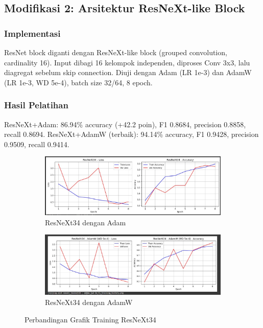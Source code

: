 \documentclass[11pt,a4paper]{article}
\begin{document}
\subsection{Modifikasi 2: Arsitektur ResNeXt-like Block}
\subsubsection{Implementasi}
ResNet block diganti dengan ResNeXt-like block (grouped convolution, cardinality 16). Input dibagi 16 kelompok independen, diproses Conv 3x3, lalu diagregat sebelum skip connection. Diuji dengan Adam (LR 1e-3) dan AdamW (LR 1e-3, WD 5e-4), batch size 32/64, 8 epoch.

\subsubsection{Hasil Pelatihan}
ResNeXt+Adam: 86.94\% accuracy (+42.2 poin), F1 0.8684, precision 0.8858, recall 0.8694. ResNeXt+AdamW (terbaik): 94.14\% accuracy, F1 0.9428, precision 0.9509, recall 0.9414. 

\begin{figure}[h]
\centering
\begin{subfigure}{0.49\textwidth}
\includegraphics[width=\textwidth]{Figure/tahap-3-resnext34.jpg}
\caption{ResNeXt34 dengan Adam}
\label{fig:resnext34-adam}
\end{subfigure}
\hfill
\begin{subfigure}{0.49\textwidth}
\includegraphics[width=\textwidth]{Figure/tahap-3-resnext34-adamw.jpg}
\caption{ResNeXt34 dengan AdamW}
\label{fig:resnext34-adamw}
\end{subfigure}
\caption{Perbandingan Grafik Training ResNeXt34}
\label{fig:resnext34-comparison}
\end{figure}
\end{document}
